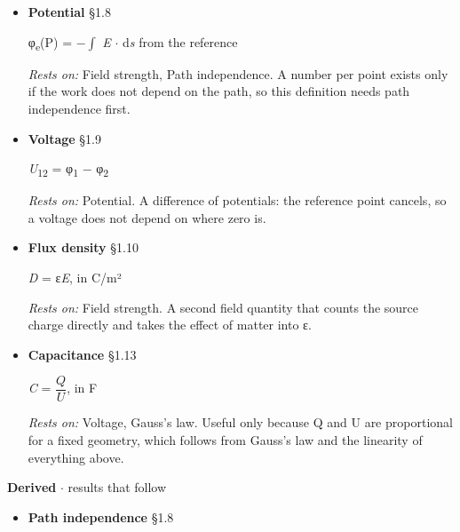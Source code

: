 \documentclass[11pt]{article}
\begin{document}
\begin{keepsection}
\begin{itemize}
\textit{E} = {\small\ensuremath{\dfrac{{F}}{{Q}}}}, in V/m

\emph{Rests on:} Coulomb’s law, Superposition. Well defined only because Coulomb’s law makes F proportional to the probe charge, so F/Q does not depend on the probe. Superposition gives the field of any arrangement.
\item {}
\textbf{Potential} \hfill{\small\color{FAUblue}§1.8}

φ\textsubscript{e}(P) = \ensuremath{-}$\int $ \textit{E} \ensuremath{\cdot} d\textit{s} from the reference

\emph{Rests on:} Field strength, Path independence. A number per point exists only if the work does not depend on the path, so this definition needs path independence first.
\item {}
\textbf{Voltage} \hfill{\small\color{FAUblue}§1.9}

\textit{U}\textsubscript{12} = φ\textsubscript{1} \ensuremath{-} φ\textsubscript{2}

\emph{Rests on:} Potential. A difference of potentials: the reference point cancels, so a voltage does not depend on where zero is.
\item {}
\textbf{Flux density} \hfill{\small\color{FAUblue}§1.10}

\textit{D} = ε\textit{E}, in C/m²

\emph{Rests on:} Field strength. A second field quantity that counts the source charge directly and takes the effect of matter into ε.
\item {}
\textbf{Capacitance} \hfill{\small\color{FAUblue}§1.13}

\textit{C} = {\small\ensuremath{\dfrac{{Q}}{{U}}}}, in F

\emph{Rests on:} Voltage, Gauss’s law. Useful only because Q and U are proportional for a fixed geometry, which follows from Gauss’s law and the linearity of everything above.
\end{itemize}

\textbf{Derived} \ensuremath{\cdot} results that follow

\begin{itemize}
\item {}
\textbf{Path independence} \hfill{\small\color{FAUblue}§1.8}


\end{itemize}
\end{keepsection}
\end{document}
